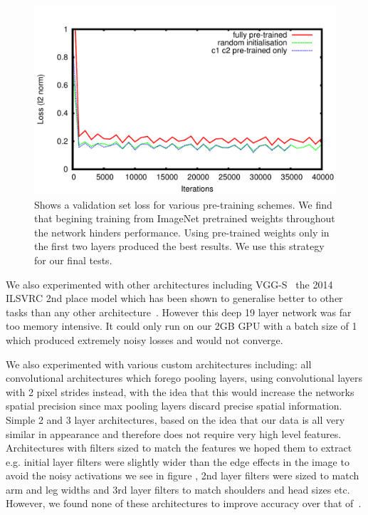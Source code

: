 \documentclass[11pt]{article} %
\begin{document}
\begin{figure}
\centering
\includegraphics*[width=0.9\linewidth,clip]{alexNetComp.pdf} 
\caption{Shows a validation set loss for various pre-training schemes. We find that begining training from ImageNet pretrained weights throughout the network hinders performance. Using pre-trained weights only in the first two layers produced the best results. We use this strategy for our final tests. \label{fig:alexNetpre}}
\end{figure}

We also experimented with other architectures including VGG-S~\cite{Simonyan2015} the 2014 ILSVRC 2nd place model which has been shown to generalise better to other tasks than any other architecture~\cite{Chatfield2014}. However this deep 19 layer network was far too memory intensive. It could only run on our 2GB GPU with a batch size of 1 which produced extremely noisy losses and would not converge. 

We also experimented with various custom architectures including: all convolutional architectures which forego pooling layers, using convolutional layers with 2 pixel strides instead, with the idea that this would increase the networks spatial precision since max pooling layers discard precise spatial information. Simple 2 and 3 layer architectures, based on the idea that our data is all very similar in appearance and therefore does not require very high level features. Architectures with filters sized to match the features we hoped them to extract e.g. initial layer filters were slightly wider than the edge effects in the image to avoid the noisy activations we see in figure \cite{fig:norm1}, 2nd layer filters were sized to match arm and leg widths and 3rd layer filters to match shoulders and head sizes etc. However, we found none of these architectures to improve accuracy over that of~\cite{Krizhevsky2012}. 
\end{document}
